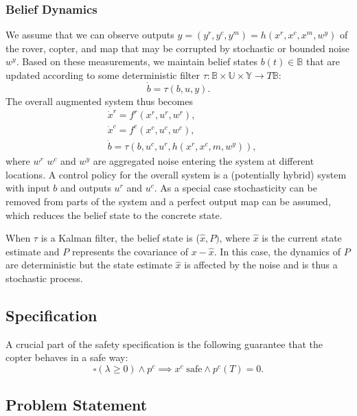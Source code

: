 \documentclass[conference]{IEEEtran}
\begin{document}
\subsubsection{Belief Dynamics}

We assume that we can observe outputs $y = (y^r, y^c, y^m) = h(x^r, x^c, x^m, w^y)$ of the rover, copter, and map that may be corrupted by stochastic or bounded noise $w^y$. Based on these measurements, we maintain belief states $b(t) \in \mathbb{B}$ that are updated according to some deterministic filter $\tau : \mathbb{B} \times \mathbb{U} \times \mathbb{Y} \rightarrow T \mathbb{B}$:
\begin{equation}
  \dot b = \tau(b, u, y).
\end{equation} 
The overall augmented system thus becomes
\begin{equation}
\label{eq:belief}
\begin{aligned}
  & \dot x^r = f^r(x^r, u^r, w^r), \\
  & \dot x^c = f^c(x^c, u^c, w^c), \\
  & \dot b = \tau(b, u^c, u^r, h(x^r, x^c, m, w^y)),
\end{aligned}
\end{equation}
where $w^r$ $w^c$ and $w^y$ are aggregated noise entering the system at different locations. A control policy for the overall system is a (potentially hybrid) system with input $b$ and outputs $u^r$ and $u^c$. As a special case stochasticity can be removed from parts of the system and a perfect output map can be assumed, which reduces the belief state to the concrete state. 

When $\tau$ is a Kalman filter, the belief state is ($\hat x, P)$, where $\hat x$ is the current state estimate and $P$ represents the covariance of $x - \hat x$. In this case, the dynamics of $P$ are deterministic but the state estimate $\hat x$ is affected by the noise and is thus a stochastic process.


\subsection{Specification}

A crucial part of the safety specification is the following guarantee that the copter behaves in a safe way:
\begin{equation}
  \square (\lambda \geq 0) \land p^c \implies x^c \; \text{safe} \land p^c(T) = 0.
\end{equation}


\subsection{Problem Statement}
\end{document}
